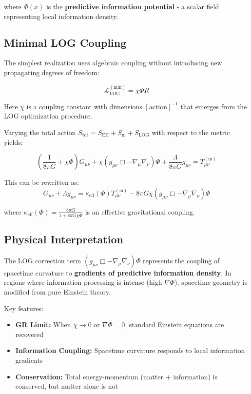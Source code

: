 \documentclass[12pt]{article}
\begin{document}
where $\Phi(x)$ is the \textbf{predictive information potential} - a scalar field representing local information density.

\subsection{Minimal LOG Coupling}

The simplest realization uses algebraic coupling without introducing new propagating degrees of freedom:

\begin{equation}
\mathcal{L}_{\mathrm{LOG}}^{\mathrm{(min)}} = \chi \Phi R \tag{2.3}
\end{equation}

Here $\chi$ is a coupling constant with dimensions $[\text{action}]^{-1}$ that emerges from the LOG optimization procedure.

Varying the total action $S_{\mathrm{tot}} = S_{\mathrm{EH}} + S_{\mathrm{m}} + S_{\mathrm{LOG}}$ with respect to the metric yields:

\begin{equation}
\boxed{\left(\frac{1}{8\pi G} + \chi \Phi\right)G_{\mu\nu} + \chi(g_{\mu\nu}\Box - \nabla_\mu\nabla_\nu)\Phi + \frac{\Lambda}{8\pi G}g_{\mu\nu} = T_{\mu\nu}^{(\mathrm{m})}} \tag{2.4}
\end{equation}

This can be rewritten as:
\begin{equation}
G_{\mu\nu} + \Lambda g_{\mu\nu} = \kappa_{\mathrm{eff}}(\Phi) T_{\mu\nu}^{(\mathrm{m})} - 8\pi G \chi (g_{\mu\nu}\Box - \nabla_\mu\nabla_\nu)\Phi \tag{2.5}
\end{equation}

where $\kappa_{\mathrm{eff}}(\Phi) = \frac{8\pi G}{1 + 8\pi G \chi \Phi}$ is an effective gravitational coupling.

\subsection{Physical Interpretation}

The LOG correction term $(g_{\mu\nu}\Box - \nabla_\mu\nabla_\nu)\Phi$ represents the coupling of spacetime curvature to \textbf{gradients of predictive information density}. In regions where information processing is intense (high $\nabla\Phi$), spacetime geometry is modified from pure Einstein theory.

Key features:
\begin{itemize}
    \item \textbf{GR Limit:} When $\chi \to 0$ or $\nabla\Phi = 0$, standard Einstein equations are recovered
    \item \textbf{Information Coupling:} Spacetime curvature responds to local information gradients
    \item \textbf{Conservation:} Total energy-momentum (matter + information) is conserved, but matter alone is not
\end{itemize}
\end{document}
